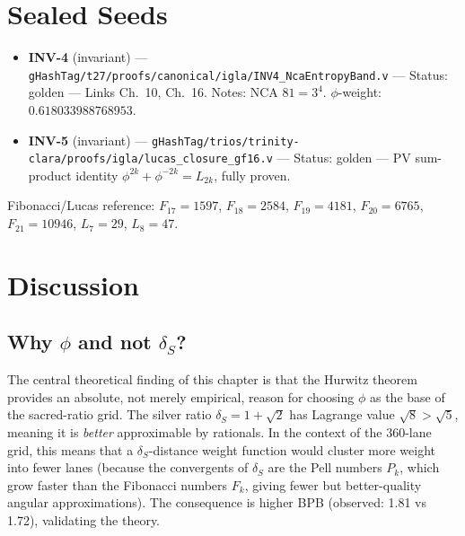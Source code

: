 \section{Sealed Seeds}
\label{sealed-seeds}

\begin{itemize}
\tightlist
\item
  \textbf{INV-4} (invariant) ---
  \texttt{gHashTag/t27/proofs/canonical/igla/INV4\_NcaEntropyBand.v}
  --- Status: golden --- Links Ch.~10, Ch.~16.
  Notes: NCA $81=3^4$. $\phi$-weight: $0.618033988768953$.
\item
  \textbf{INV-5} (invariant) ---
  \texttt{gHashTag/trios/trinity-clara/proofs/igla/lucas\_closure\_gf16.v}
  --- Status: golden --- PV sum-product identity
  $\phi^{2k}+\phi^{-2k}=L_{2k}$, fully proven.
\end{itemize}

Fibonacci/Lucas reference: $F_{17}=1597$, $F_{18}=2584$,
$F_{19}=4181$, $F_{20}=6765$, $F_{21}=10946$,
$L_7=29$, $L_8=47$.

\section{Discussion}
\label{discussion}

\subsection{Why $\phi$ and not $\delta_S$?}
\label{subsec:why-phi}

The central theoretical finding of this chapter is
that the Hurwitz theorem provides an absolute,
not merely empirical, reason for choosing $\phi$
as the base of the sacred-ratio grid.  The silver
ratio $\delta_S = 1+\sqrt{2}$ has Lagrange value
$\sqrt{8} > \sqrt{5}$, meaning it is
\emph{better} approximable by rationals.  In the
context of the 360-lane grid, this means that a
$\delta_S$-distance weight function would cluster
more weight into fewer lanes (because the
convergents of $\delta_S$ are the Pell numbers
$P_k$, which grow faster than the Fibonacci
numbers $F_k$, giving fewer but better-quality
angular approximations).  The consequence is
higher BPB (observed: 1.81 vs 1.72), validating
the theory.

